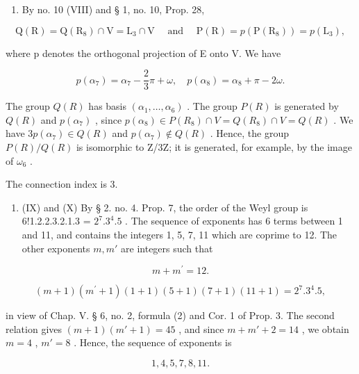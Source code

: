 \begin{enumerate}
\def\labelenumi{(\Roman{enumi})}
\setcounter{enumi}{7}
\tightlist
\item
  By no. 10 (VIII) and § 1, no. 10, Prop. 28,
\end{enumerate}

\[
\mathrm{Q} (\mathrm{R}) = \mathrm{Q} (\mathrm{R} _ {8}) \cap \mathrm{V} = \mathrm{L} _ {3} \cap \mathrm{V} \quad \text { and } \quad \mathrm{P} (\mathrm{R}) = p (\mathrm{P} (\mathrm{R} _ {8})) = p (\mathrm{L} _ {3}),
\]

where p denotes the orthogonal projection of E onto V. We have

\[
p (\alpha_ {7}) = \alpha_ {7} - \frac {2}{3} \pi + \omega , \quad p (\alpha_ {8}) = \alpha_ {8} + \pi - 2 \omega .
\]

The group \(Q(R)\) has basis \((\alpha_{1},\ldots,\alpha_{6})\) . The group \(P(R)\) is generated by \(Q(R)\) and \(p(\alpha_{7})\) , since \(p(\alpha_{8})\in P(R_{8})\cap V=Q(R_{8})\cap V=Q(R)\) . We have \(3p(\alpha_{7})\in Q(R)\) and \(p(\alpha_{7})\notin Q(R)\) . Hence, the group \(P(R)/Q(R)\) is isomorphic to Z/3Z; it is generated, for example, by the image of \(\omega_{6}\) .

The connection index is 3.

\begin{enumerate}
\def\labelenumi{(\Roman{enumi})}
\setcounter{enumi}{8}
\tightlist
\item
  (IX) and (X) By § 2. no. 4. Prop. 7, the order of the Weyl group is 6!1.2.2.3.2.1.3 = \(2^{7}.3^{4}.5\) . The sequence of exponents has 6 terms between 1 and 11, and contains the integers 1, 5, 7, 11 which are coprime to 12. The other exponents \(m, m'\) are integers such that
\end{enumerate}

\[
m + m ^ {\prime} = 12.
\]

\[
(m + 1) \left(m ^ {\prime} + 1\right) (1 + 1) (5 + 1) (7 + 1) (11 + 1) = 2 ^ {7}. 3 ^ {4}. 5,
\]

in view of Chap. V. § 6, no. 2, formula (2) and Cor. 1 of Prop. 3. The second relation gives \((m + 1)(m' + 1) = 45\) , and since \(m + m' + 2 = 14\) , we obtain \(m = 4\) , \(m' = 8\) . Hence, the sequence of exponents is

\[
1, 4, 5, 7, 8, 11.
\]

